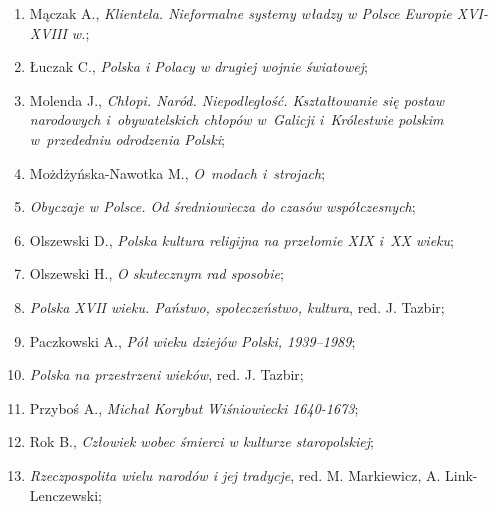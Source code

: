 \documentclass[a4paper,11pt]{article}
\begin{document}
\begin{enumerate}
\item Mączak A., \textit{Klientela. Nieformalne systemy władzy w Polsce
    Europie XVI-XVIII w.};



\item Łuczak C., \textit{Polska i Polacy w drugiej wojnie światowej};



\item Molenda J., \textit{Chłopi. Naród. Niepodległość. Kształtowanie
    się postaw narodowych i~obywatelskich chłopów w~Galicji
    i~Królestwie polskim w~przededniu odrodzenia Polski};



\item Możdżyńska-Nawotka M., \textit{O~modach i~strojach};



\item \textit{Obyczaje w Polsce. Od średniowiecza do czasów
    współczesnych};



\item Olszewski D., \textit{Polska kultura religijna na przełomie XIX
    i~XX wieku};



\item Olszewski H., \textit{O skutecznym rad sposobie};



\item \textit{Polska XVII wieku. Państwo, społeczeństwo, kultura}, red.
  J. Tazbir;



\item Paczkowski A., \textit{Pół wieku dziejów Polski, 1939--1989};



\item \textit{Polska na przestrzeni wieków}, red. J. Tazbir;



\item Przyboś A., \textit{Michał Korybut Wiśniowiecki 1640-1673};



\item Rok B., \textit{Człowiek wobec śmierci w kulturze staropolskiej};



\item \textit{Rzeczpospolita wielu narodów i jej tradycje}, red. M.
  Markiewicz, A. Link-Lenczewski;




\end{enumerate}
\end{document}
